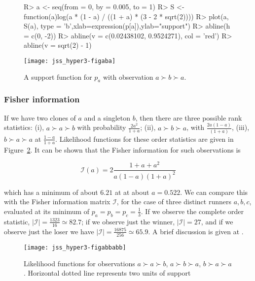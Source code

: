 \documentclass[article]{jss}
\begin{document}
\begin{figure}[htbp]
  \begin{center}
\begin{Schunk}
\begin{Sinput}
R> a <- seq(from = 0, by = 0.005, to = 1)
R> S <- function(a){log(a * (1 - a) / ((1 + a) * (3 - 2 * sqrt(2))))}
R> plot(a, S(a), type = 'b',xlab=expression(p[a]),ylab="support")
R> abline(h = c(0, -2))
R> abline(v = c(0.02438102, 0.9524271), col = 'red')
R> abline(v = sqrt(2) - 1)
\end{Sinput}
\end{Schunk}
\texttt{[image: jss\_hyper3-figaba]}
\caption{A\label{ABA_likelihood} support function for $p_a$ with observation $a\succ b\succ a$.}
\end{center}
\end{figure}

\subsubsection{Fisher information}
If we have two clones of $a$ and a singleton $b$, then there are three
possible rank statistics: (i), $a\succ a\succ b$ with probability
$\frac{2a^2}{1+a}$; (ii), $a\succ b\succ a$, with
$\frac{2a(1-a)}{(1+a)}$, (iii), $b\succ a\succ a$ at
$\frac{1-a}{1+a}$.  Likelihood functions for these order statistics
are given in Figure~\ref{ABAetc_likelihood}.  It can be shown that the
Fisher information for such observations is

\begin{equation}
\mathcal{I}(a)=2\frac{1+a+a^2}{a(1-a)(1+a)^2}
\end{equation}

which has a minimum of about $6.21$ at at about $a=0.522$.  We can
compare this with the Fisher information matrix ${\mathcal I}$, for
the case of three distinct runners $a,b,c$, evaluated at its minimum
of $p_a=p_b=p_c=\frac{1}{3}$.  If we observe the complete order
statistic, $\left|{\mathcal I}\right| =\frac{1323}{16}\simeq 82.7$; if
we observe just the winner, $\left|{\mathcal I}\right|=27$, and if we
observe just the loser we have $\left|{\mathcal
I}\right|=\frac{16875}{256}\simeq 65.9$.  A brief discussion is given
at .

\begin{figure}[htbp]
  \begin{center}
\texttt{[image: jss\_hyper3-figabbabb]}
\caption{Likelihood \label{ABAetc_likelihood} functions for
observations $a\succ a\succ b$, $a\succ b\succ a$, $b\succ a\succ a$.  Horizontal dotted
line represents two units of support}
\end{center}
\end{figure}
\end{document}
